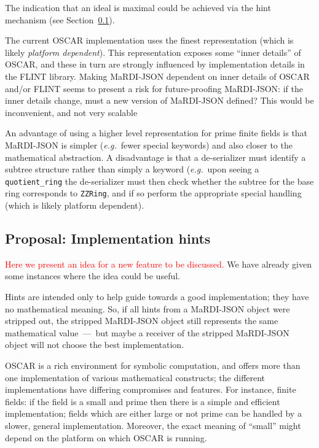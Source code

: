 \documentclass{article}
\newcommand{\MaRDIJSON}{MaRDI-JSON}
\newcommand \eg {\textit{e.g.}}
\def\red#1{\textcolor{red}{#1}}
\begin{document}
The indication that an ideal is maximal could be achieved via the hint
mechanism (see Section~\ref{sec:hints}).

The current OSCAR implementation uses the finest representation (which
is likely \textit{platform dependent}).  This representation exposes
some ``inner details'' of OSCAR, and these in turn are strongly
influenced by implementation details in the FLINT library.  Making
{\MaRDIJSON} dependent on inner details of OSCAR and/or FLINT seems to
present a risk for future-proofing {\MaRDIJSON}: if the inner details
change, must a new version of {\MaRDIJSON} defined?  This would be
inconvenient, and not very scalable

An advantage of using a higher level representation for prime finite fields
is that {\MaRDIJSON} is simpler (\eg~fewer special keywords) and also
closer to the mathematical abstraction.  A disadvantage is that a
de-serializer must identify a subtree structure rather than simply a
keyword (\eg~upon seeing a \verb|quotient_ring| the de-serializer
must then check whether the subtree for the base ring corresponds to
\verb|ZZRing|, and if so perform the appropriate special handling
(which is likely platform dependent).


\subsection{Proposal: Implementation hints}
\label{sec:hints}

\red{Here we present an idea for a new feature to be discussed.}  We have
already given some instances where the idea could be useful.

Hints are intended only to help guide towards a good implementation;
they have no mathematical meaning.  So, if all hints from a
{\MaRDIJSON} object were stripped out, the stripped {\MaRDIJSON}
object still represents the same mathematical value~---~but maybe a
receiver of the stripped {\MaRDIJSON} object will not choose the best
implementation.

OSCAR is a rich environment for symbolic computation, and offers
more than one implementation of various mathematical constructs;
the different implementations have differing compromises and features.
For instance, finite fields: if the field is a small and prime then
there is a simple and efficient implementation; fields which are
either large or not prime can be handled by a slower, general implementation.
Moreover, the exact meaning of ``small'' might depend on the platform
on which OSCAR is running.
\end{document}
